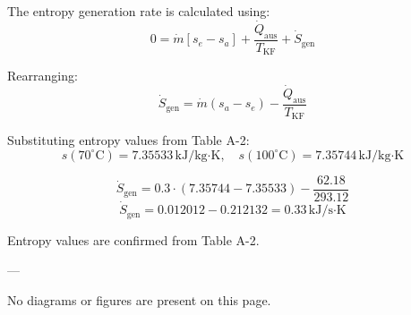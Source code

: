 The entropy generation rate is calculated using:  
\[
0 = \dot{m} [s_e - s_a] + \frac{\dot{Q}_{\text{aus}}}{T_{\text{KF}}} + \dot{S}_{\text{gen}}
\]  

Rearranging:  
\[
\dot{S}_{\text{gen}} = \dot{m} (s_a - s_e) - \frac{\dot{Q}_{\text{aus}}}{T_{\text{KF}}}
\]  

Substituting entropy values from Table A-2:  
\[
s(70^\circ\text{C}) = 7.35533 \, \text{kJ/kg·K}, \quad s(100^\circ\text{C}) = 7.35744 \, \text{kJ/kg·K}
\]  

\[
\dot{S}_{\text{gen}} = 0.3 \cdot (7.35744 - 7.35533) - \frac{62.18}{293.12}
\]  
\[
\dot{S}_{\text{gen}} = 0.012012 - 0.212132 = 0.33 \, \text{kJ/s·K}
\]  

Entropy values are confirmed from Table A-2.  

---

No diagrams or figures are present on this page.